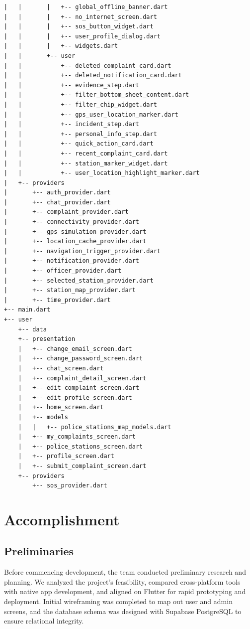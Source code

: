 \documentclass[12pt, a4paper, twoside, openany]{report}
\begin{document}
\begin{footnotesize}
\begin{verbatim}
|   |       |   +-- global_offline_banner.dart
|   |       |   +-- no_internet_screen.dart
|   |       |   +-- sos_button_widget.dart
|   |       |   +-- user_profile_dialog.dart
|   |       |   +-- widgets.dart
|   |       +-- user
|   |           +-- deleted_complaint_card.dart
|   |           +-- deleted_notification_card.dart
|   |           +-- evidence_step.dart
|   |           +-- filter_bottom_sheet_content.dart
|   |           +-- filter_chip_widget.dart
|   |           +-- gps_user_location_marker.dart
|   |           +-- incident_step.dart
|   |           +-- personal_info_step.dart
|   |           +-- quick_action_card.dart
|   |           +-- recent_complaint_card.dart
|   |           +-- station_marker_widget.dart
|   |           +-- user_location_highlight_marker.dart
|   +-- providers
|       +-- auth_provider.dart
|       +-- chat_provider.dart
|       +-- complaint_provider.dart
|       +-- connectivity_provider.dart
|       +-- gps_simulation_provider.dart
|       +-- location_cache_provider.dart
|       +-- navigation_trigger_provider.dart
|       +-- notification_provider.dart
|       +-- officer_provider.dart
|       +-- selected_station_provider.dart
|       +-- station_map_provider.dart
|       +-- time_provider.dart
+-- main.dart
+-- user
    +-- data
    +-- presentation
    |   +-- change_email_screen.dart
    |   +-- change_password_screen.dart
    |   +-- chat_screen.dart
    |   +-- complaint_detail_screen.dart
    |   +-- edit_complaint_screen.dart
    |   +-- edit_profile_screen.dart
    |   +-- home_screen.dart
    |   +-- models
    |   |   +-- police_stations_map_models.dart
    |   +-- my_complaints_screen.dart
    |   +-- police_stations_screen.dart
    |   +-- profile_screen.dart
    |   +-- submit_complaint_screen.dart
    +-- providers
        +-- sos_provider.dart
\end{verbatim}
\end{footnotesize}
\chapter{Accomplishment}
\section{Preliminaries}
Before commencing development, the team conducted preliminary research and planning. We analyzed the project's feasibility, compared cross-platform tools with native app development, and aligned on Flutter for rapid prototyping and deployment. Initial wireframing was completed to map out user and admin screens, and the database schema was designed with Supabase PostgreSQL to ensure relational integrity.
\end{document}
